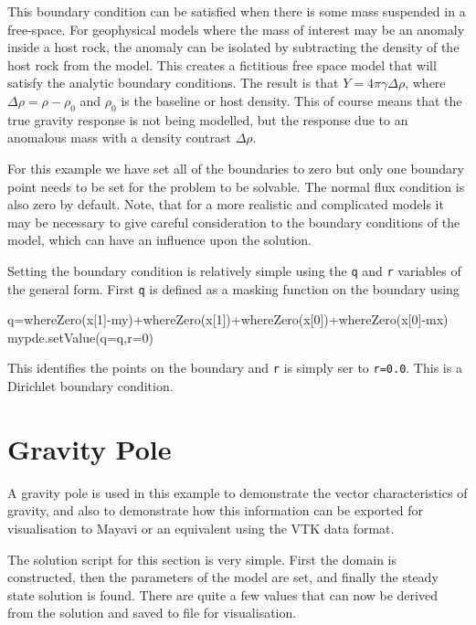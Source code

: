 This boundary condition can be satisfied when there is some mass suspended in a
free-space. For geophysical models where the mass of interest may be an anomaly
inside a host rock, the anomaly can be isolated by subtracting the density of the
host rock from the model. This creates a fictitious free space model that will
satisfy the analytic boundary conditions. The result is that
$Y=4\pi\gamma\Delta\rho$, where $\Delta\rho=\rho-\rho_0$ and $\rho_0$ is the
baseline or host density. This of course means that the true gravity response is
not being modelled, but the response due to an anomalous mass with a
density contrast $\Delta\rho$.

For this example we have set all of the boundaries to zero but only one boundary
point needs to be set for the problem to be solvable. The normal flux condition
is also zero by default. Note, that for a more realistic and complicated models
it may be necessary to give careful consideration to the boundary conditions of the model,
which can have an influence upon the solution.

Setting the boundary condition is relatively simple using the \verb!q! and
\verb!r! variables of the general form. First \verb!q! is defined as a masking
function on the boundary using
\begin{python}
q=whereZero(x[1]-my)+whereZero(x[1])+whereZero(x[0])+whereZero(x[0]-mx)
mypde.setValue(q=q,r=0)
\end{python}
This identifies the points on the boundary and \verb!r! is simply
ser to \verb!r=0.0!. This is a Dirichlet boundary condition.

\clearpage
\section{Gravity Pole}
A gravity pole is used in this example to demonstrate the vector characteristics
of gravity, and also to demonstrate how this information can be exported for
visualisation to Mayavi or an equivalent using the VTK data format.

The solution script for this section is very simple. First the domain is
constructed, then the parameters of the model are set, and finally the steady
state solution is found. There are quite a few values that can now be derived
from the solution and saved to file for visualisation.

